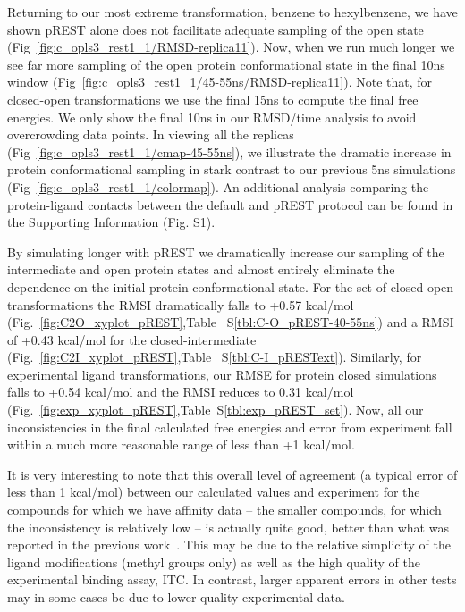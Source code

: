 \documentclass[journal=jctcce,manuscript=article]{achemso}
\begin{document}
Returning to our most extreme transformation, benzene to hexylbenzene, we have shown pREST alone does not facilitate adequate sampling of the open state (Fig~\ref{fig:c_opls3_rest1_1/RMSD-replica11}).
Now, when we run much longer we see far more sampling of the open protein conformational state in the final 10ns window (Fig~\ref{fig:c_opls3_rest1_1/45-55ns/RMSD-replica11}).
Note that, for closed-open transformations we use the final 15ns to compute the final free energies.
We only show the final 10ns in our RMSD/time analysis to avoid overcrowding data points.
In viewing all the replicas (Fig~\ref{fig:c_opls3_rest1_1/cmap-45-55ns}), we illustrate the dramatic increase in protein conformational sampling in stark contrast to our previous 5ns simulations (Fig~\ref{fig:c_opls3_rest1_1/colormap}).
An additional analysis comparing the protein-ligand contacts between the default and pREST protocol can be found in the Supporting Information (Fig. S1).

By simulating longer with pREST we dramatically increase our sampling of the intermediate and open protein states and almost entirely eliminate the dependence on the initial protein conformational state.
For the set of closed-open transformations the RMSI dramatically falls to +0.57 kcal/mol (Fig.~\ref{fig:C2O_xyplot_pREST},Table ~S\ref{tbl:C-O_pREST-40-55ns}) and a RMSI of +0.43 kcal/mol for the closed-intermediate (Fig.~\ref{fig:C2I_xyplot_pREST},Table ~S\ref{tbl:C-I_pRESText}).
Similarly, for experimental ligand transformations, our RMSE for protein closed simulations falls to +0.54 kcal/mol and the RMSI reduces to 0.31 kcal/mol (Fig.~\ref{fig:exp_xyplot_pREST},Table~S\ref{tbl:exp_pREST_set}).
Now, all our inconsistencies in the final calculated free energies and error from experiment fall within a much more reasonable range of less than +1 kcal/mol.  

It is very interesting to note that this overall level of agreement (a typical error of less than 1 kcal/mol) between our calculated values and experiment for the compounds for which we have affinity data -- the smaller compounds, for which the inconsistency is relatively low -- is actually quite good, better than what was reported in the previous work~\cite{FEPplus}.  
This may be due to the relative simplicity of the ligand modifications (methyl groups only) as well as the high quality of the experimental binding assay, ITC. 
In contrast, larger apparent errors in other tests may in some cases be due to lower quality experimental data. 
 
\end{document}
